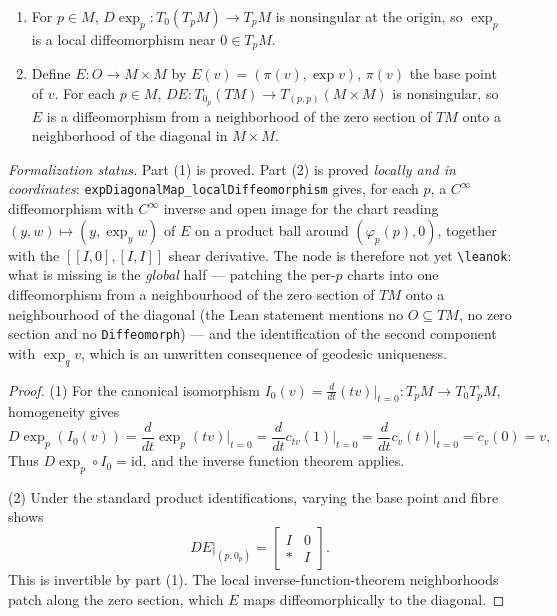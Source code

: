 \begin{proposition}
  \label{prop:pet-ch5-exp-diffeomorphism-properties}
  \begin{enumerate}
  \item For $p\in M$, $D\exp_p:T_0(T_pM)\to T_pM$ is nonsingular at the origin, so
  $\exp_p$ is a local diffeomorphism near $0\in T_pM$.
  \item Define $E:O\to M\times M$ by $E(v)=(\pi(v),\exp v)$, $\pi(v)$ the base point
  of $v$. For each $p\in M$, $DE:T_{0_p}(TM)\to T_{(p,p)}(M\times M)$ is nonsingular,
  so $E$ is a diffeomorphism from a neighborhood of the zero section of $TM$ onto a
  neighborhood of the diagonal in $M\times M$.
  \end{enumerate}

  \emph{Formalization status.} Part (1) is proved. Part (2) is proved
  \emph{locally and in coordinates}: \texttt{expDiagonalMap\_localDiffeomorphism}
  gives, for each $p$, a $C^\infty$ diffeomorphism with $C^\infty$ inverse and open
  image for the chart reading $(y,w)\mapsto(y,\exp_y w)$ of $E$ on a product ball
  around $(\varphi_p(p),0)$, together with the $[[I,0],[I,I]]$ shear derivative.
  The node is therefore not yet \texttt{\textbackslash leanok}: what is missing is
  the \emph{global} half — patching the per-$p$ charts into one diffeomorphism from
  a neighbourhood of the zero section of $TM$ onto a neighbourhood of the diagonal
  (the Lean statement mentions no $O\subseteq TM$, no zero section and no
  \texttt{Diffeomorph}) — and the identification of the second component with
  $\exp_q v$, which is an unwritten consequence of geodesic uniqueness.
\end{proposition}
\begin{proof}
  \sketch
  (1) For the canonical isomorphism
  $I_0(v)=\frac{d}{dt}(tv)|_{t=0}:T_pM\to T_0T_pM$, homogeneity gives
  \[
    D\exp_p(I_0(v))=\frac{d}{dt}\exp_p(tv)\Big|_{t=0}
    =\frac{d}{dt}c_{tv}(1)\Big|_{t=0}=\frac{d}{dt}c_v(t)\Big|_{t=0}=\dot c_v(0)=v,
  \]
  Thus $D\exp_p\circ I_0=\mathrm{id}$, and the inverse function theorem applies.

  (2) Under the standard product identifications, varying the base point and fibre
  shows
  \[
    DE|_{(p,0_p)}=\begin{bmatrix}I&0\\ *&I\end{bmatrix}.
  \]
  This is invertible by part (1).  The local inverse-function-theorem neighborhoods
  patch along the zero section, which $E$ maps diffeomorphically to the diagonal.
\end{proof}

